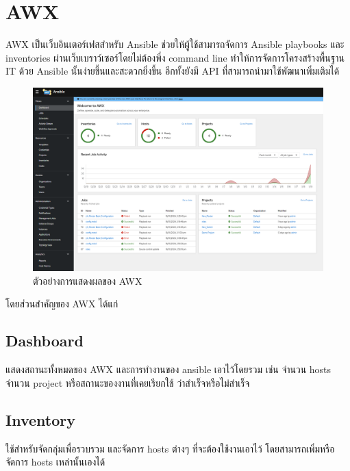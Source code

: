 \section{AWX}
\hspace{0.5in} AWX เป็นเว็บอินเตอร์เฟสสำหรับ Ansible ช่วยให้ผู้ใช้สามารถจัดการ Ansible playbooks และ inventories ผ่านเว็บเบราว์เซอร์โดยไม่ต้องพึ่ง command line ทำให้การจัดการโครงสร้างพื้นฐาน IT ด้วย Ansible นั้นง่ายขึ้นและสะดวกยิ่งขึ้น 
อีกทั้งยังมี API ที่สามารถนำมาใช้พัฒนาเพิ่มเติมได้

\begin{figure}[h]
  \begin{center}
    \includegraphics[scale=0.55]{awx.png}
  \end{center}
  \caption[Poem]{ตัวอย่างการแสดงผลของ AWX}
  \label{fig:ansible_playbook}
\end{figure}

\hspace{0.3in} โดยส่วนสำคัญของ AWX ได้แก่


\subsection{Dashboard}
\hspace{0.5in} แสดงสถานะทั้งหมดของ AWX และการทำงานของ ansible เอาไว้โดยรวม เช่น จำนวน hosts จำนวน project หรือสถานะของงานที่เคยเรียกใช้ ว่าสำเร็จหรือไม่สำเร็จ

\subsection{Inventory}
\hspace{0.5in} ใช้สำหรับจัดกลุ่มเพื่อรวบรวม และจัดการ hosts ต่างๆ ที่จะต้องใช้งานเอาไว้ โดยสามารถเพิ่มหรือจัดการ hosts เหล่านั้นเองได้

